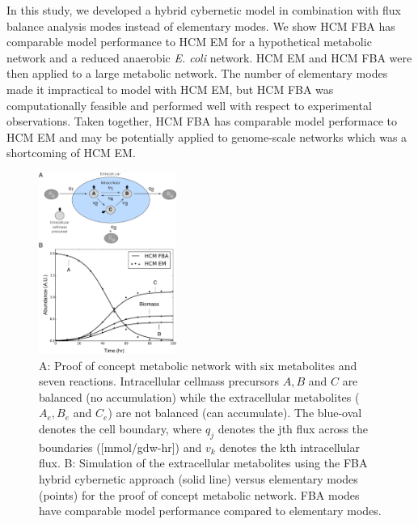 \documentclass[10pt,twocolumn,twoside,final]{IEEEtran}
\begin{document}
In this study, we developed a hybrid cybernetic model in combination with flux balance analysis modes instead of elementary modes.
We show HCM FBA has comparable model performance to HCM EM for a hypothetical metabolic network and a reduced anaerobic \textit{E. coli} network.
HCM EM and HCM FBA were then applied to a large metabolic network.
The number of elementary modes made it impractical to model with HCM EM, but HCM FBA was computationally feasible and performed well with respect to experimental observations.
Taken together, HCM FBA has comparable model performace to HCM EM and may be potentially applied to genome-scale networks which was a shortcoming of HCM EM.


\begin{figure}[!t]\centering
\includegraphics[width=0.40\textwidth]{./figs/Fig-1-GeneralModel-Results.pdf}
\caption{A: Proof of concept metabolic network with six metabolites and seven reactions.
Intracellular cellmass precursors $A,B$ and $C$ are balanced (no accumulation) while the extracellular metabolites ($A_{e},B_{e}$ and $C_{e}$) are not balanced (can accumulate). The blue-oval denotes the cell boundary, where $q_{j}$ denotes the jth flux across the boundaries ([mmol/gdw-hr]) and $v_{k}$ denotes the kth intracellular flux. B: Simulation of the extracellular metabolites using the FBA hybrid cybernetic approach (solid line) versus elementary modes (points) for the proof of concept metabolic network. FBA modes have comparable model performance compared to elementary modes.
}\label{fig:model-fitting}
\end{figure}
\end{document}
